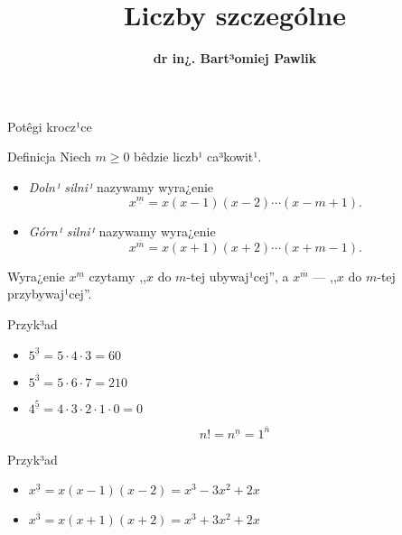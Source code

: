 \documentclass[a4paper,10pt]{beamer}
\title{\bf Liczby szczególne}
\author[B. Pawlik]{\bf dr in¿. Bart³omiej Pawlik}
\begin{document}
\begin{frame}
\titlepage
\end{frame}






\begin{frame}{Potêgi krocz¹ce}
\begin{block}{Definicja}
Niech $m\geqslant0$ bêdzie liczb¹ ca³kowit¹.
\begin{itemize}
\item {\it Doln¹ silni¹} nazywamy wyra¿enie
$$x^{\underline{m}}=x(x-1)(x-2)\cdots(x-m+1).$$
\item {\it Górn¹ silni¹} nazywamy wyra¿enie
$$x^{\overline{m}}=x(x+1)(x+2)\cdots(x+m-1).$$
\end{itemize}
\end{block}

\bigskip

Wyra¿enie $x^{\underline{m}}$ czytamy ,,$x$ do $m$-tej ubywaj¹cej'', a $x^{\overline{m}}$ --- ,,$x$ do $m$-tej przybywaj¹cej''.
\end{frame}


\begin{frame}

\begin{exampleblock}{Przyk³ad}
\begin{itemize}
\item $5^{\underline{3}}=5\cdot4\cdot3=60$
\item $5^{\overline{3}}=5\cdot6\cdot7=210$
\item $4^{\underline{5}}=4\cdot3\cdot2\cdot1\cdot0=0$
\end{itemize}
\end{exampleblock}

\begin{block}{}
$$n!=n^{\underline{n}}=1^{\overline{n}}$$
\end{block}

\begin{exampleblock}{Przyk³ad}
\begin{itemize}
\item $x^{\underline{3}}=x(x-1)(x-2)=x^3-3x^2+2x$
\item $x^{\overline{3}}=x(x+1)(x+2)=x^3+3x^2+2x$
\end{itemize}
\end{exampleblock}
\end{frame}
\end{document}
